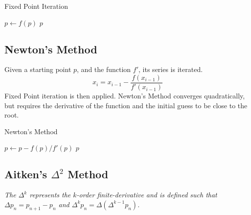 \documentclass[12pt]{article}
\numberwithin{equation}{subsection}
\begin{document}
            \begin{center}
            \begin{algorithm}[H]
                \caption{Fixed Point Iteration}
                \begin{algorithmic}[1]
                        \State $p \gets f(p)$
                    \EndWhile
                    \State \Return $p$
                    \EndProcedure
                \end{algorithmic}
            \end{algorithm}
            \end{center}

        \subsection{Newton's Method}

            Given a starting point $p$, and the function $f'$, its series is
            iterated.
            $$x_{i} = x_{i-1} - \frac{f(x_{i-1})}{f'(x_{i-1})}$$
            Fixed Point iteration is then applied. Newton's Method converges
            quadratically, but requires the derivative
            of the function and the initial guess to be close to the root.

            \begin{center}
            \begin{algorithm}[H]
                \caption{Newton's Method}
                \begin{algorithmic}[1]
                        \State $p \gets p - f(p)/f'(p)$
                    \EndWhile
                    \State \Return $p$
                    \EndProcedure
                \end{algorithmic}
            \end{algorithm}
            \end{center}

        \subsection{Aitken's $\Delta^2$ Method}

            \textit{The $\Delta^k$ represents the $k$-order finite-derivative and is
            defined such that $\Delta p_n = p_{n+1} - p_{n}$ and
            $\Delta^k p_n = \Delta (\Delta^{k-1} p_n)$.}\\
\end{document}
